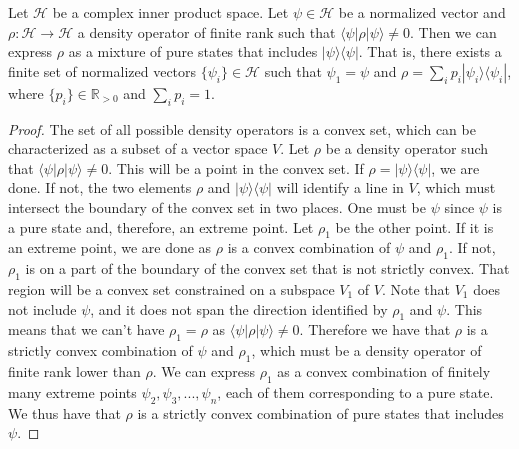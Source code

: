 \documentclass[10pt,twocolumn, nofootinbib]{revtex4-2}
\def\>{\rangle}
\def\<{\langle}
\begin{document}
\begin{prop}\label{prop_decomposition}
Let $\mathcal{H}$ be a complex inner product space. Let $\psi \in \mathcal{H}$ be a normalized vector and $\rho : \mathcal{H} \to \mathcal{H}$ a density operator of finite rank such that $\<\psi|\rho|\psi\>\neq 0$. Then we can express $\rho$ as a mixture of pure states that includes $|\psi\>\<\psi|$. That is, there exists a finite set of normalized vectors $\{\psi_i\} \in \mathcal{H}$ such that $\psi_1 = \psi$ and $\rho = \sum_i p_i |\psi_i\>\<\psi_i|$, where $\{p_i\} \in \mathbb{R}_{>0}$ and $\sum_i p_i = 1$.
\end{prop}

\begin{proof}
The set of all possible density operators is a convex set, which can be characterized as a subset of a vector space $V$. Let $\rho$ be a density operator such that $\<\psi|\rho|\psi\>\neq 0$. This will be a point in the convex set. If $\rho = |\psi\>\<\psi|$, we are done. If not, the two elements $\rho$ and $|\psi\>\<\psi|$ will identify a line in $V$, which must intersect the boundary of the convex set in two places. One must be $\psi$ since $\psi$ is a pure state and, therefore, an extreme point. Let $\rho_1$ be the other point. If it is an extreme point, we are done as $\rho$ is a convex combination of $\psi$ and $\rho_1$. If not, $\rho_1$ is on a part of the boundary of the convex set that is not strictly convex. That region will be a convex set constrained on a subspace $V_1$ of $V$. Note that $V_1$ does not include $\psi$, and it does not span the direction identified by $\rho_1$ and $\psi$. This means that we can't have $\rho_1 = \rho$ as $\<\psi|\rho|\psi\>\neq 0$. Therefore we have that $\rho$ is a strictly convex combination of $\psi$ and $\rho_1$, which must be a density operator of finite rank lower than $\rho$. We can express $\rho_1$ as a convex combination of finitely many extreme points $\psi_2, \psi_3, ..., \psi_n$, each of them corresponding to a pure state. We thus have that $\rho$ is a strictly convex combination of pure states that includes $\psi$.
\end{proof}
\end{document}
